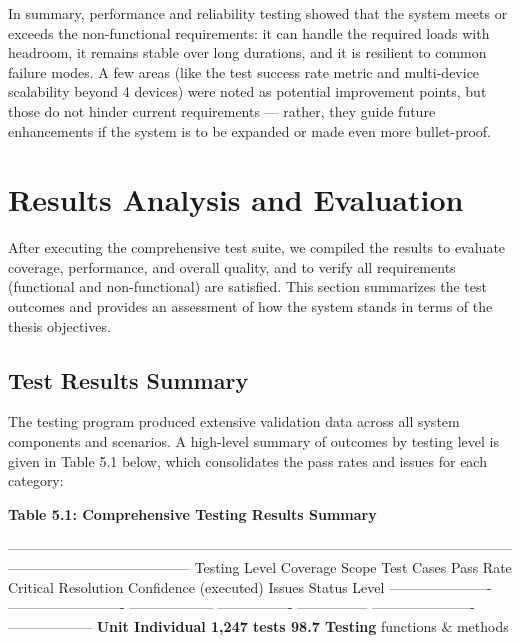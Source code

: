 {In summary, performance and reliability testing showed that the system
meets or exceeds the non-functional requirements: it can handle the
required loads with headroom, it remains stable over long durations, and
it is resilient to common failure modes. A few areas (like the test
success rate metric and multi-device scalability beyond 4 devices) were
noted as potential improvement points, but those do not hinder current
requirements --- rather, they guide future enhancements if the system is
to be expanded or made even more bullet-proof.

\section{Results Analysis and Evaluation}

After executing the comprehensive test suite, we compiled the results to
evaluate coverage, performance, and overall quality, and to verify all
requirements (functional and non-functional) are satisfied. This section
summarizes the test outcomes and provides an assessment of how the
system stands in terms of the thesis objectives.

\subsection{Test Results Summary}

The testing program produced extensive validation data across all system
components and scenarios. A high-level summary of outcomes by testing
level is given in Table 5.1 below, which consolidates the pass rates and
issues for each category:

\textbf{Table 5.1: Comprehensive Testing Results Summary}

  ---------------------------------------------------------------------------------------------------------------------------------------------------
  Testing Level   Coverage Scope    Test Cases   Pass Rate   Critical   Resolution      Confidence
                                    (executed)               Issues     Status          Level
  ---------------------- ------------------------- ------------------ ---------------- --------------- ---------------------- ------------------
  \textbf{Unit          Individual        1,247 tests  98.7%
  Testing}       functions &                                                           
                  methods                                                               

}
